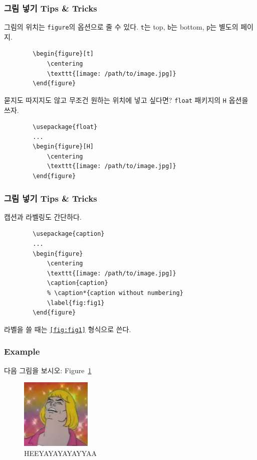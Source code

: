 \begin{frame}[fragile]
    \frametitle{그림 넣기 Tips \& Tricks}

    그림의 위치는 \texttt{figure}의 옵션으로 줄 수 있다. \texttt{t}는 top, \texttt{b}는 bottom, \texttt{p}는 별도의 페이지.
    \begin{verbatim}
        \begin{figure}[t]
            \centering
            \texttt{[image: /path/to/image.jpg]}
        \end{figure}
    \end{verbatim}

    묻지도 따지지도 않고 무조건 원하는 위치에 넣고 싶다면? \texttt{float} 패키지의 \texttt{H} 옵션을 쓰자.
    \begin{verbatim}
        \usepackage{float}
        ...
        \begin{figure}[H]
            \centering
            \texttt{[image: /path/to/image.jpg]}
        \end{figure}
    \end{verbatim}

\end{frame}

\begin{frame}[fragile]
    \frametitle{그림 넣기 Tips \& Tricks}

    캡션과 라벨링도 간단하다.
    \begin{verbatim}
        \usepackage{caption}
        ...
        \begin{figure}
            \centering
            \texttt{[image: /path/to/image.jpg]}
            \caption{caption}
            % \caption*{caption without numbering}
            \label{fig:fig1}
        \end{figure}
    \end{verbatim}
    라벨을 쓸 때는 \texttt{\ref{fig:fig1}} 형식으로 쓴다.

\end{frame}

\begin{frame}
    \frametitle{Example}

    다음 그림을 보시오: Figure~\ref{fig:heeman}

    \begin{figure}
        \centering
        \includegraphics[width=0.3\textwidth]{heeman.jpg}
        \caption{HEEYAYAYAYAYYAA}
        \label{fig:heeman}
    \end{figure}

\end{frame}


